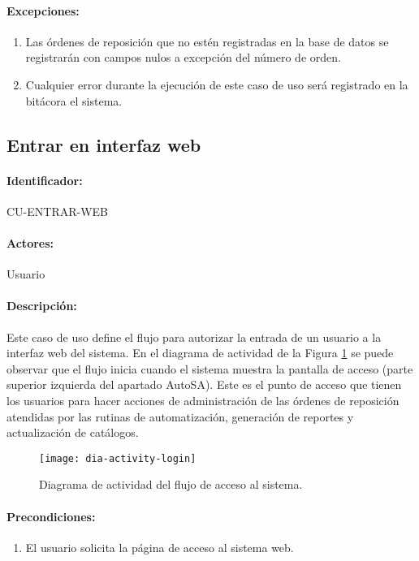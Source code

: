 \paragraph{Excepciones:}
\begin{enumerate}
  \item Las órdenes de reposición que no estén registradas en la base de datos se registrarán con campos nulos a excepción del número de orden.
  \item Cualquier error durante la ejecución de este caso de uso será registrado en la bitácora el sistema.
\end{enumerate}


\subsection{Entrar en interfaz web}\label{cu-entrar-web}
\paragraph{Identificador:}
CU-ENTRAR-WEB
\paragraph{Actores:}
Usuario
\paragraph{Descripción:}
Este caso de uso define el flujo para autorizar la entrada de un usuario a la interfaz web del sistema. En el diagrama de actividad de la Figura \ref{fig:dia-activity-login} se puede observar que el flujo inicia cuando el sistema muestra la pantalla de acceso (parte superior izquierda del apartado AutoSA). Este es el punto de acceso que tienen los usuarios para hacer acciones de administración de las órdenes de reposición atendidas por las rutinas de automatización, generación de reportes y actualización de catálogos.
\begin{figure}[h]
  \centering
  \texttt{[image: dia-activity-login]}
  \caption{Diagrama de actividad del flujo de acceso al sistema.}
  \label{fig:dia-activity-login}
\end{figure}
\paragraph{Precondiciones:}
\begin{enumerate}
  \item El usuario solicita la página de acceso al sistema web.
\end{enumerate}
\pagebreak
